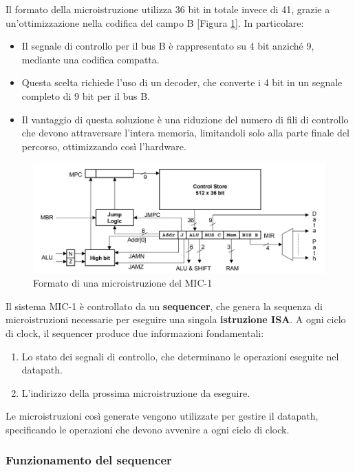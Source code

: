 Il formato della microistruzione utilizza 36 bit in totale invece di 41, grazie a un'ottimizzazione nella codifica del campo B [Figura \ref{fig:mic1_microinstruction_format}]. In particolare:
\begin{itemize}
    \item Il segnale di controllo per il bus B è rappresentato su 4 bit anziché 9, mediante una codifica compatta.
    \item Questa scelta richiede l'uso di un decoder, che converte i 4 bit in un segnale completo di 9 bit per il bus B.
    \item Il vantaggio di questa soluzione è una riduzione del numero di fili di controllo che devono attraversare l'intera memoria, limitandoli solo alla parte finale del percorso, ottimizzando così l'hardware.
\end{itemize}

\begin{figure}[h]
    \centering
    \includegraphics[width=0.8\linewidth]{img/mic1_microinstruction_format.jpg}
    \caption{Formato di una microistruzione del MIC-1}
    \label{fig:mic1_microinstruction_format}
\end{figure}

Il sistema MIC-1 è controllato da un \textbf{sequencer}, che genera la sequenza di microistruzioni necessarie per eseguire una singola \textbf{istruzione ISA}. A ogni ciclo di clock, il sequencer produce due informazioni fondamentali:

\begin{enumerate}
    \item Lo stato dei segnali di controllo, che determinano le operazioni eseguite nel datapath.
    \item L'indirizzo della prossima microistruzione da eseguire.
\end{enumerate}

Le microistruzioni così generate vengono utilizzate per gestire il datapath, specificando le operazioni che devono avvenire a ogni ciclo di clock.

\subsubsection*{Funzionamento del sequencer}


